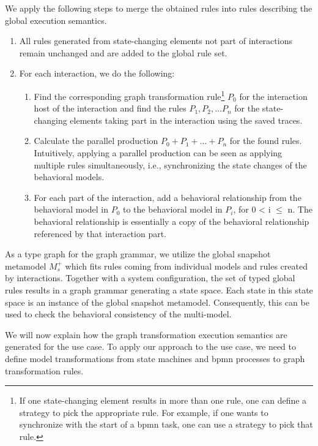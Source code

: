 \documentclass{jot}
\begin{document}
We apply the following steps to merge the obtained rules into rules describing the global execution semantics.
\begin{enumerate}
    \item All rules generated from state-changing elements not part of interactions remain unchanged and are added to the global rule set.
    \item For each interaction, we do the following:
     \begin{enumerate}
         \item Find the corresponding graph transformation rule\footnote{If one state-changing element results in more than one rule, one can define a strategy to pick the appropriate rule.
         For example, if one wants to synchronize with the start of a \gls*{bpmn} task, one can use a strategy to pick that rule.} $P_0$ for the interaction host of the interaction and find the rules $P_1, P_2, \ldots P_n$ for the state-changing elements taking part in the interaction using the saved traces.
         \item Calculate the parallel production \cite[Definition 3.2.7]{baldanConcurrentSemanticsAlgebraic1999} $P_0 + P_1 + \ldots + P_n$ for the found rules.
         Intuitively, applying a parallel production can be seen as applying multiple rules simultaneously, i.e., synchronizing the state changes of the behavioral models.
         \item For each part of the interaction, add a behavioral relationship from the behavioral model in $P_0$ to the behavioral model in $P_i$, for 0 < i $\leq$ n.
         The behavioral relationship is essentially a copy of the behavioral relationship referenced by that interaction part.
     \end{enumerate}
\end{enumerate}

As a type graph for the graph grammar, we utilize the global snapshot metamodel $M_s^+$ which fits rules coming from individual models and rules created by interactions.
Together with a system configuration, the set of typed global rules results in a graph grammar generating a state space.
Each state in this state space is an instance of the global snapshot metamodel.
Consequently, this can be used to check the behavioral consistency of the multi-model.

We will now explain how the graph transformation execution semantics are generated for the use case.
To apply our approach to the use case, we need to define model transformations from state machines and \gls*{bpmn} processes to graph transformation rules.
\end{document}
